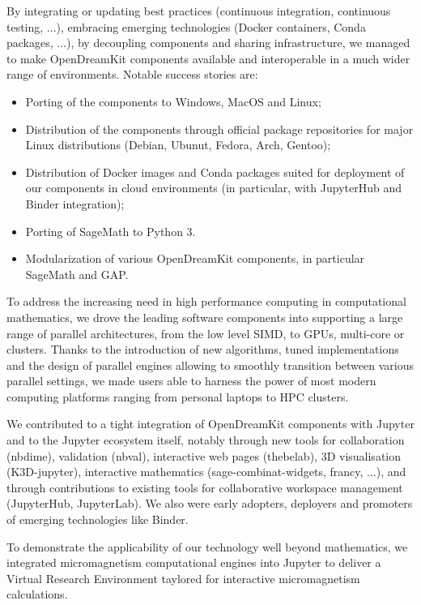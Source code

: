 By integrating or updating best practices (continuous integration, continuous testing, ...), embracing emerging technologies (Docker containers, Conda packages, ...), by decoupling components and sharing infrastructure, we managed to make OpenDreamKit components available and interoperable in a much wider range of environments.  Notable success stories are:

\begin{itemize}
\item Porting of the components to Windows, MacOS and Linux;
\item Distribution of the components through official package repositories for major Linux distributions (Debian, Ubunut, Fedora, Arch, Gentoo);
\item Distribution of Docker images and Conda packages suited for deployment of our components in cloud environments (in particular, with JupyterHub and Binder integration);
\item Porting of SageMath to Python 3.
\item Modularization of various OpenDreamKit components, in particular SageMath and GAP.
\end{itemize}

To address the increasing need in high performance computing in computational mathematics, we drove the leading software components into supporting a large range of parallel architectures, from the low level SIMD, to GPUs, multi-core or clusters. Thanks to the introduction of new algorithms, tuned implementations and the design of parallel engines allowing to smoothly transition between various parallel settings, we made users able to harness the power of most modern computing platforms ranging from personal laptops to HPC clusters.

We contributed to a tight integration of OpenDreamKit components with Jupyter and to the Jupyter ecosystem itself, notably through new tools for collaboration (nbdime), validation (nbval), interactive web pages (thebelab), 3D visualisation (K3D-jupyter), interactive mathematics (sage-combinat-widgets, francy, ...), and through contributions to existing tools for collaborative workspace management (JupyterHub, JupyterLab). We also were early adopters, deployers and promoters of emerging technologies like Binder.

To demonstrate the applicability of our technology well beyond mathematics, we integrated micromagnetism computational engines into Jupyter to deliver a Virtual Research Environment taylored for interactive micromagnetism calculations.

